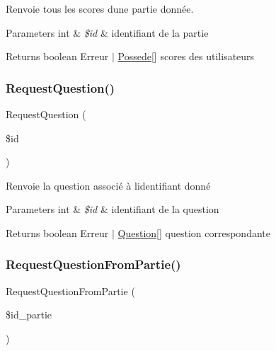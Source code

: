Renvoie tous les scores d\textquotesingle{}une partie donnée. 


\begin{DoxyParams}[1]{Parameters}
int & {\em \$id} & identifiant de la partie\\
\hline
\end{DoxyParams}
\begin{DoxyReturn}{Returns}
boolean Erreur $\vert$ \mbox{\hyperlink{class_possede}{Possede}}\mbox{[}\mbox{]} scores des utilisateurs 
\end{DoxyReturn}
\mbox{\label{class_interface_b_d_d_a363d433b9362a9d7e70c3b88f665c6e2}} 
\subsubsection{\texorpdfstring{Request\+Question()}{RequestQuestion()}}
{\footnotesize\ttfamily Request\+Question (\begin{DoxyParamCaption}\item[{}]{\$id }\end{DoxyParamCaption})}



Renvoie la question associé à l\textquotesingle{}identifiant donné 


\begin{DoxyParams}[1]{Parameters}
int & {\em \$id} & identifiant de la question\\
\hline
\end{DoxyParams}
\begin{DoxyReturn}{Returns}
boolean Erreur $\vert$ \mbox{\hyperlink{class_question}{Question}}\mbox{[}\mbox{]} question correspondante 
\end{DoxyReturn}
\mbox{\label{class_interface_b_d_d_a9135bab40bcea0ecd11a167be9442445}} 
\subsubsection{\texorpdfstring{Request\+Question\+From\+Partie()}{RequestQuestionFromPartie()}}
{\footnotesize\ttfamily Request\+Question\+From\+Partie (\begin{DoxyParamCaption}\item[{}]{\$id\+\_\+partie }\end{DoxyParamCaption})}



